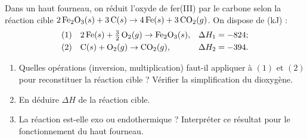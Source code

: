 \documentclass[11pt,a4paper]{article}
\newcommand{\dH}{\Delta H}
\begin{document}
\begin{exercice}
Dans un haut fourneau, on réduit l'oxyde de fer(III) par le carbone selon la réaction cible
\;$2\,\ce{Fe2O3}(s) + 3\,\ce{C}(s) \rightarrow 4\,\ce{Fe}(s) + 3\,\ce{CO2}(g)$.\;
On dispose de (\si{\kilo\joule}) :
\begin{align*}
(1)\quad & 2\,\ce{Fe}(s) + \tfrac32\,\ce{O2}(g) \rightarrow \ce{Fe2O3}(s), & \dH_1 &= -824 ; \\
(2)\quad & \ce{C}(s) + \ce{O2}(g) \rightarrow \ce{CO2}(g), & \dH_2 &= -394 .
\end{align*}
\begin{enumerate}[label=\alph*),leftmargin=2em,topsep=2pt,itemsep=2pt]
  \item Quelles opérations (inversion, multiplication) faut-il appliquer à $(1)$ et $(2)$ pour reconstituer
        la réaction cible ? Vérifier la simplification du dioxygène.
  \item En déduire $\dH$ de la réaction cible.
  \item La réaction est-elle exo ou endothermique ? Interpréter ce résultat pour le fonctionnement du
        haut fourneau.
\end{enumerate}
\end{exercice}
\end{document}
